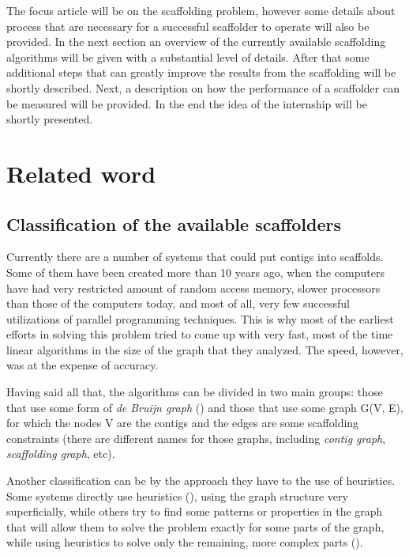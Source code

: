 \documentclass[11pt]{article}
\begin{document}
The focus article will be on the scaffolding problem, however some details about
process that are necessary for a successful scaffolder to operate will also be
provided. In the next section an overview of the currently available scaffolding
algorithms will be given with a substantial level of details. After that some
additional steps that can greatly improve the results from the scaffolding will
be shortly described. Next, a description on how the performance of a scaffolder
can be measured will be provided. In the end the idea of the internship will be
shortly presented.


\section{Related word} %
\label{sec:Related word}

\subsection{Classification of the available scaffolders} %
\label{sub:Classification of the available scaffolders}
Currently there are a number of systems that could put contigs into scaffolds.
Some of them have been created more than 10 years ago, when the computers have
had very restricted amount of random access memory, slower processors than
those of the computers today, and most of all, very few successful utilizations
of parallel programming techniques. This is why most of the earliest efforts in
solving this problem tried to come up with very fast, most of the time linear
algorithms in the size of the graph that they analyzed. The speed, however, was
at the expense of accuracy.

Having said all that, the algorithms can be divided in two main groups: those
that use some form of \emph{de Bruijn graph} (\cite{pevzner, velvet-scaffolding})
and those that use some graph G(V, E), for which the
nodes V are the contigs and the edges are some scaffolding constraints (there
are different names for those graphs, including \emph{contig graph},
\emph{scaffolding graph}, etc).

Another classification can be by the approach they have to the use of
heuristics. Some systems directly use heuristics (\cite{greedy-path-merging, SOAPdenovo, SSPACE}),
using the graph structure very superficially,
while others try to find some patterns or properties in the graph that will
allow them to solve the problem exactly for some parts of the graph, while using
heuristics to solve only the remaining, more complex parts (\cite{SOPRA, MIR, Opera,
SCARPA, grass}).
\end{document}
